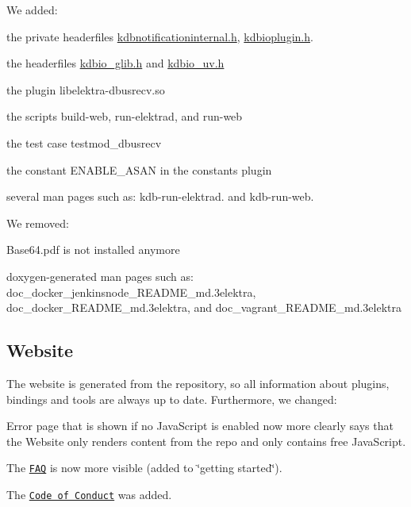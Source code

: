We added\+:


\begin{DoxyItemize}
\item the private headerfiles {\ttfamily \hyperlink{kdbnotificationinternal_8h}{kdbnotificationinternal.\+h}}, {\ttfamily \hyperlink{kdbioplugin_8h}{kdbioplugin.\+h}}.
\item the headerfiles {\ttfamily \hyperlink{kdbio__glib_8h}{kdbio\+\_\+glib.\+h}} and {\ttfamily \hyperlink{kdbio__uv_8h}{kdbio\+\_\+uv.\+h}}
\item the plugin {\ttfamily libelektra-\/dbusrecv.\+so}
\item the scripts {\ttfamily build-\/web}, {\ttfamily run-\/elektrad}, and {\ttfamily run-\/web}
\item the test case {\ttfamily testmod\+\_\+dbusrecv}
\item the constant {\ttfamily E\+N\+A\+B\+L\+E\+\_\+\+A\+S\+AN} in the constants plugin
\item several man pages such as\+: {\ttfamily kdb-\/run-\/elektrad.} and {\ttfamily kdb-\/run-\/web.}
\end{DoxyItemize}

We removed\+:


\begin{DoxyItemize}
\item {\ttfamily Base64.\+pdf} is not installed anymore
\item doxygen-\/generated man pages such as\+: {\ttfamily doc\+\_\+docker\+\_\+jenkinsnode\+\_\+\+R\+E\+A\+D\+M\+E\+\_\+md.\+3elektra}, {\ttfamily doc\+\_\+docker\+\_\+\+R\+E\+A\+D\+M\+E\+\_\+md.\+3elektra}, and {\ttfamily doc\+\_\+vagrant\+\_\+\+R\+E\+A\+D\+M\+E\+\_\+md.\+3elektra}
\end{DoxyItemize}

\subsection*{Website}

The website is generated from the repository, so all information about plugins, bindings and tools are always up to date. Furthermore, we changed\+:


\begin{DoxyItemize}
\item Error page that is shown if no Java\+Script is enabled now more clearly says that the Website only renders content from the repo and only contains free Java\+Script.
\item The \href{https://www.libelektra.org/docgettingstarted/faq}{\tt F\+AQ} is now more visible (added to \char`\"{}getting started\char`\"{}).
\item The \href{https://www.libelektra.org/devgettingstarted/code-of-conduct}{\tt Code of Conduct} was added.
\end{DoxyItemize}

